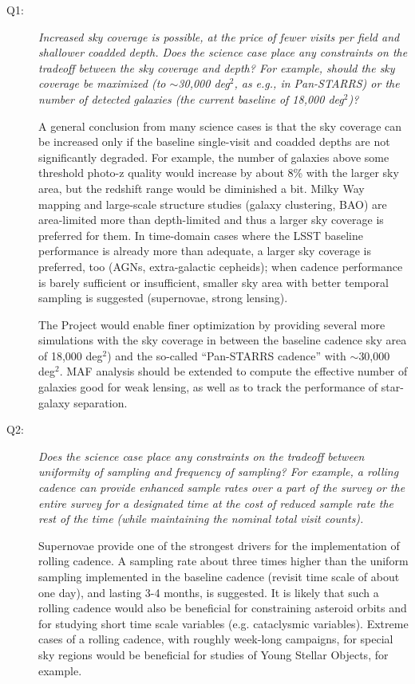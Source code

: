 \begin{description}

\item[Q1:] {\it Increased sky coverage is possible, at the price of fewer visits per field and shallower
coadded depth.  Does the science case place any constraints on the
tradeoff between the sky coverage and depth? For example, should
the sky coverage be maximized (to $\sim$30,000 deg$^2$, as e.g., in
Pan-STARRS) or the number of detected galaxies (the current baseline of 18,000 deg$^2$)?}

A general conclusion from many science cases is that the sky coverage
can be increased only if the baseline single-visit and coadded depths
are not significantly degraded. For example, the number of galaxies above
some threshold photo-z quality would increase by about 8\% with the larger
sky area, but the redshift range would be diminished a bit. Milky Way mapping and large-scale
structure studies (\eg galaxy clustering, BAO) are
area-limited more than depth-limited and thus a larger sky coverage is
preferred for them. In time-domain cases where the LSST baseline performance is already
more than adequate, a larger sky coverage is preferred, too (AGNs,
extra-galactic cepheids); when cadence performance is barely sufficient
or insufficient, smaller sky area with better temporal sampling is suggested
(supernovae, strong lensing).

The Project would enable finer optimization by providing several more
simulations with the sky coverage in between the baseline cadence sky
area of 18,000 deg$^2$) and the so-called ``Pan-STARRS cadence'' with
$\sim$30,000 deg$^2$. MAF analysis should be extended to compute the
effective number of galaxies good for weak lensing, as well as to track
the performance of star-galaxy separation.


\item[Q2:] {\it Does the science case place any constraints on the
tradeoff between uniformity of sampling and frequency of  sampling? For
example, a rolling cadence can provide enhanced sample rates over a part
of the survey or the entire survey for a designated time at the cost of
reduced sample rate the rest of the time (while maintaining the nominal
total visit counts).}

Supernovae provide one of the strongest drivers for the implementation of
rolling cadence. A sampling rate about three times higher than the
uniform sampling implemented in the baseline cadence (revisit time scale of
about one day), and lasting 3-4 months, is suggested. It is likely that
such a rolling cadence would also be beneficial for constraining
asteroid orbits and for studying short time scale variables (e.g.
cataclysmic variables). Extreme cases of a rolling cadence, with roughly
week-long campaigns, for special sky regions would be beneficial for
studies of Young Stellar Objects, for example.


\end{description}
